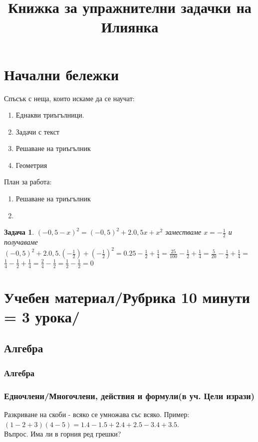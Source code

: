 \documentclass{article}
\date{}
\title{Книжка за упражнителни задачки на Илиянка}
\newtheorem{problem}{Задача}
\begin{document}
	
	
	\maketitle
	\tableofcontents
	
	\section{Начални бележки}
	Спъсък с неща, които искаме да се научат:
	\begin{enumerate}
		\item Еднакви триъгълници.
		\item Задачи с текст
		\item Решаване на триъгълник
		\item Геометрия
		
		
	\end{enumerate}
	План за работа:
	\begin{enumerate}
		\item Решаване на триъгълник
		\item 
	\end{enumerate}
	
	\begin{problem}
		$(-0,5-x)^2 = (-0,5)^2 + 2.0,5x + x^2$ заместваме $x = -\frac{1}{2} $ и получаваме
	 $(-0,5)^2 + 2.0,5.(-\frac{1}{2}) + (-\frac{1}{2})^2 = 0.25 -\frac{1}{2} + \frac{1}{4}= \frac{25}{100}-\frac{1}{2} + \frac{1}{4} = \frac{5}{20}-\frac{1}{2} + \frac{1}{4} =$ \\
	 $\frac{1}{4}-\frac{1}{2} + \frac{1}{4} = \frac{2}{4} - \frac{1}{2}= \frac{1}{2} - \frac{1}{2} = 0 $ 
\end{problem}
	\section{Учебен материал/Рубрика 10 минути = 3 урока/}
	\subsection{Алгебра}
	\subsubsection{Алгебра}
	\subsubsection{Едночлени/Многочлени, действия и формули(в уч. Цели изрази)}
	Разкриване на скоби - всяко се умножава със всяко. Пример:\\
	$(1-2+3)(4-5) = 1.4 - 1.5 + 2.4 + 2.5 - 3.4 + 3.5$. \\
	Въпрос. Има ли в горния ред грешки?\\
	
\end{document}
